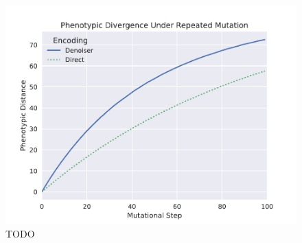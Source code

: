 \begin{figure}
  \includegraphics[width=\linewidth]{img/scrabble_dist_vs_step}
  \caption{TODO}
  \label{fig:scrabble_dist_vs_step}
\end{figure}
